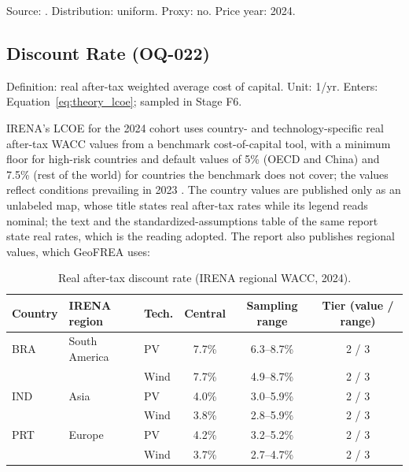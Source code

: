 Source: \cite{irena2025costs2024}. Distribution: uniform. Proxy: no.
Price year: 2024.

\subsection{Discount Rate (OQ-022)}
\label{subsec:g2_wacc}

Definition: real after-tax weighted average cost of capital. Unit: 1/yr.
Enters: Equation~\ref{eq:theory_lcoe}; sampled in Stage F6.

IRENA's LCOE for the 2024 cohort uses country- and technology-specific
real after-tax WACC values from a benchmark cost-of-capital tool, with a
minimum floor for high-risk countries and default values of 5\% (OECD and
China) and 7.5\% (rest of the world) for countries the benchmark does not
cover; the values reflect conditions prevailing in 2023
\cite{irena2025costs2024}. The country values are published only as an
unlabeled map, whose title states real after-tax rates while its legend
reads nominal; the text and the standardized-assumptions table of the
same report state real rates, which is the reading adopted. The report
also publishes regional values, which GeoFREA uses:

\begin{table}[htbp]
    \centering
    \caption{Real after-tax discount rate (IRENA regional WACC, 2024).}
    \label{tab:g2_wacc}
    \small
    \begin{tabular}{lllccc}
        \toprule
        Country & IRENA region & Tech. & Central & Sampling range & Tier (value / range) \\
        \midrule
        BRA & South America & PV   & 7.7\% & 6.3--8.7\% & 2 / 3 \\
            &               & Wind & 7.7\% & 4.9--8.7\% & 2 / 3 \\
        IND & Asia          & PV   & 4.0\% & 3.0--5.9\% & 2 / 3 \\
            &               & Wind & 3.8\% & 2.8--5.9\% & 2 / 3 \\
        PRT & Europe        & PV   & 4.2\% & 3.2--5.2\% & 2 / 3 \\
            &               & Wind & 3.7\% & 2.7--4.7\% & 2 / 3 \\
        \bottomrule
    \end{tabular}
\end{table}

